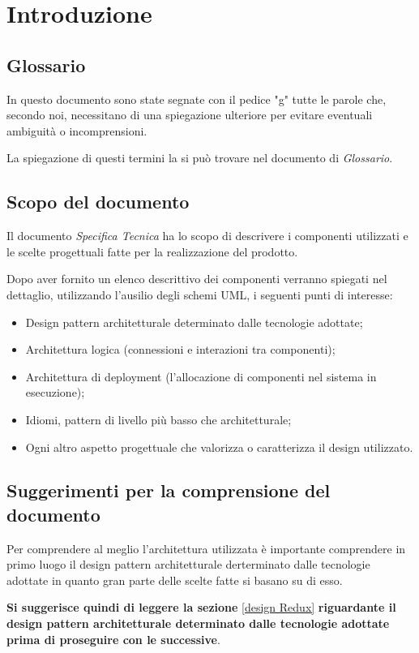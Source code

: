 \section{Introduzione}

\subsection{Glossario}
In questo documento sono state segnate con il pedice "g" tutte le parole che, secondo noi, necessitano di una spiegazione ulteriore per evitare
eventuali ambiguità o incomprensioni.

La spiegazione di questi termini la si può trovare nel documento di \textit{Glossario}.

\subsection{Scopo del documento}
Il documento \textit{Specifica Tecnica} ha lo scopo di descrivere i componenti utilizzati e le scelte progettuali fatte per la realizzazione del prodotto.

Dopo aver fornito un elenco descrittivo dei componenti verranno spiegati nel dettaglio, utilizzando l'ausilio degli schemi UML, i seguenti punti di interesse: 
\begin{itemize}
	\item Design pattern architetturale determinato dalle tecnologie adottate;
	\item Architettura logica (connessioni e interazioni tra componenti);
	\item Architettura di deployment (l’allocazione di componenti nel sistema in esecuzione);
	\item Idiomi, pattern di livello più basso che architetturale;
	\item Ogni altro aspetto progettuale che valorizza o caratterizza il design utilizzato.
\end{itemize}

\subsection{Suggerimenti per la comprensione del documento}
Per comprendere al meglio l'architettura utilizzata è importante comprendere in primo luogo il design pattern
architetturale derterminato dalle tecnologie adottate in quanto gran parte delle scelte fatte si basano su di esso.

\textbf{Si suggerisce quindi di leggere la sezione} \ref{design Redux} \textbf{riguardante il design pattern architetturale determinato 
dalle tecnologie adottate prima di proseguire con le successive}.

